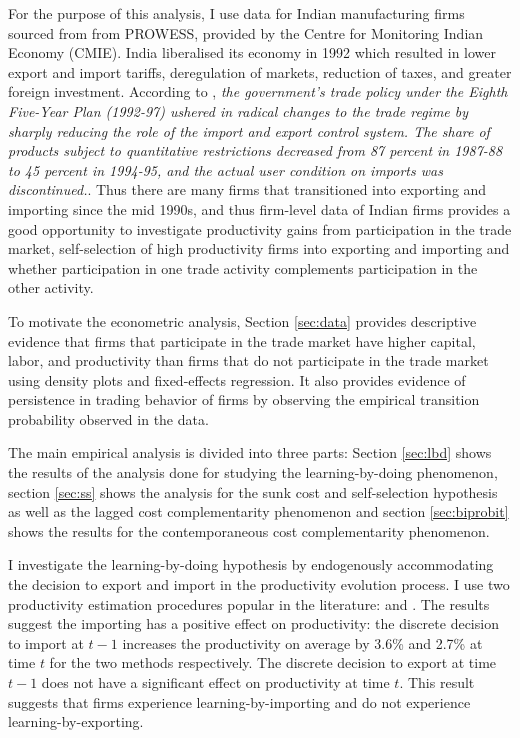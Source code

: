 \documentclass[12pt]{article}
\begin{document}
For the purpose of this analysis, I use data for Indian manufacturing
firms sourced from from PROWESS, provided by the Centre for Monitoring
Indian Economy (CMIE). India liberalised its economy in
1992 which resulted in lower export and import
tariffs, deregulation of markets, reduction of taxes, and greater 
foreign investment. According to \textcite{topalova2011trade}, \textit{the government's trade policy under the Eighth Five-Year Plan (1992-97) ushered
in radical changes to the trade regime by sharply reducing the role of
the import and export control system. The share of products subject to quantitative restrictions
decreased from 87 percent in 1987-88 to 45 percent in 1994-95, and the actual user
condition on imports was discontinued.}. Thus there are many firms
that transitioned into exporting and importing since the mid 1990s, and thus
firm-level data of Indian firms provides a good opportunity to
investigate  productivity gains from participation in
the trade market, self-selection of high productivity firms into
exporting and importing and 
whether participation in one trade activity complements participation
in the other activity.

To motivate the econometric analysis, Section \ref{sec:data} provides descriptive evidence that firms that
participate in the trade market have higher capital, labor, and
productivity than firms that do not participate in the trade
market using density plots and fixed-effects regression. It also provides evidence of persistence in trading
behavior of firms by observing the empirical transition probability observed in
the data. 

The main empirical analysis is divided into three parts: Section
\ref{sec:lbd} shows the results of the analysis done for studying the
learning-by-doing phenomenon, section \ref{sec:ss} shows the
analysis for the sunk cost and
self-selection hypothesis as well as the lagged cost complementarity
phenomenon and section \ref{sec:biprobit} shows the results for the
contemporaneous cost complementarity phenomenon.

I investigate the learning-by-doing hypothesis by endogenously
accommodating the decision to export and import in the
productivity evolution process. I use two productivity estimation
procedures popular in the literature:
\textcite{levinsohn2003estimating} and
\textcite{ackerberg2006structural}. The results suggest the importing
has a positive effect on productivity: the discrete decision to import
at $t-1$
increases the productivity on average by 3.6\% and 2.7\% at time $t$ for the two
methods respectively. The discrete decision to export at time $t-1$
does not have a significant effect on
productivity at time $t$. This result suggests that firms experience
learning-by-importing and do not experience learning-by-exporting. 
\end{document}
